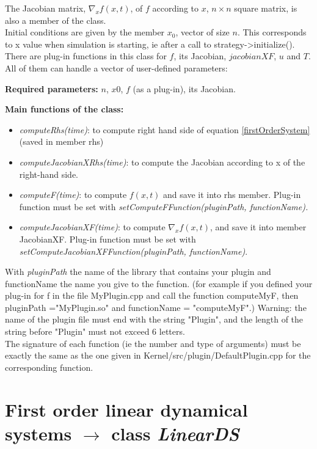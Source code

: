 \documentclass[10pt]{article}
\begin{document}
The Jacobian matrix, $\nabla_x f(x,t)$, of $f$ according to $x$, $n\times n$ square matrix, is also a member of the class. \\

Initial conditions are given by the member $x_0$, vector of size $n$. This corresponds to x value when
simulation is starting, ie after a call to strategy->initialize(). \\

There are plug-in functions in this class for $f$, its Jacobian, $jacobianXF$, $u$ and $T$. All
of them can handle a vector of user-defined parameters:

\textbf{Required parameters:} $n$, $x0$, $f$ (as a plug-in), its Jacobian.

\textbf{Main functions of the class:}
\begin{itemize}
\item \textit{computeRhs(time)}: to compute right hand side of equation \eqref{firstOrderSystem} (saved in member rhs)
\item \textit{computeJacobianXRhs(time)}: to compute the Jacobian according to x of the right-hand side.
\item \textit{computeF(time)}: to compute $f(x,t)$ and save it into rhs member. Plug-in function must be set with \it{setComputeFFunction(pluginPath, functionName)}. 
\item \textit{computeJacobianXF(time)}: to compute $\nabla_x f(x,t)$, and save it into member JacobianXF. Plug-in function must be set with \textit{setComputeJacobianXFFunction(pluginPath, functionName)}.
\end{itemize}
With \textit{pluginPath} the name of the library that contains your plugin and functionName the name you give to the function. 
(for example if you defined your plug-in for f in the file MyPlugin.cpp and call the function computeMyF, then pluginPath ="MyPlugin.so" and functionName = "computeMyF".)
Warning: the name of the plugin file must end with the string "Plugin", and the length of the string before "Plugin" must not exceed 6 letters. \\
The signature of each function (ie the number and type of arguments) must be exactly the same as the one given in Kernel/src/plugin/DefaultPlugin.cpp for the corresponding function. 

\section{First order linear dynamical systems $\rightarrow$ class \textit{LinearDS}}
\end{document}
